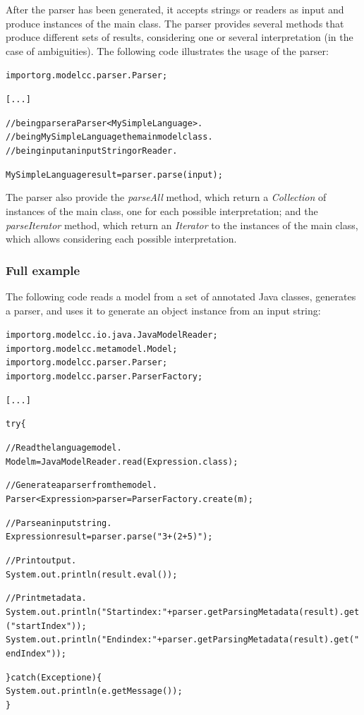 \documentclass[a4paper,twoside,onecolumn]{article}
\newenvironment{colframe}{%
  \begin{Sbox} 
    \begin{minipage}{.8\columnwidth} 
}{%

  \end{minipage} 
  \end{Sbox} 
  \begin{center} 
    \fcolorbox{black}{MyGray}{\TheSbox} 
  \end{center} 
}
\begin{document}
After the parser has been generated, it accepts strings or readers as input and produce instances of the main class. The parser provides several methods that produce different sets of results, considering one or several interpretation (in the case of ambiguities). The following code illustrates the usage of the parser:

\begin{colframe}
\begin{alltt}
import org.modelcc.parser.Parser;

[...]

//being parser a Parser<MySimpleLanguage>.
//being MySimpleLanguage the main model class.
//being input an input String or Reader.

MySimpleLanguage result = parser.parse(input);
\end{alltt}
\end{colframe}

The parser also provide the \emph{parseAll} method, which return a \emph{Collection} of instances of the main class, one for each possible interpretation; and the \emph{parseIterator} method, which return an \emph{Iterator} to the instances of the main class, which allows considering each possible interpretation.

\subsubsection{Full example} \label{sec:fullexample}

The following code reads a model from a set of annotated Java classes, generates a parser, and uses it to generate an object instance from an input string:

\begin{colframe}
\begin{alltt}
import org.modelcc.io.java.JavaModelReader;
import org.modelcc.metamodel.Model;
import org.modelcc.parser.Parser;
import org.modelcc.parser.ParserFactory;

[...]

try \{

  // Read the language model.
  Model m = JavaModelReader.read(Expression.class);

  // Generate a parser from the model.
  Parser<Expression> parser = ParserFactory.create(m);

  // Parse an input string.
  Expression result = parser.parse("3+(2+5)");

  // Print output.
  System.out.println(result.eval());

  // Print metadata.
  System.out.println("Start index: "+parser.getParsingMetadata(result).get("startIndex"));
  System.out.println("End index: "+parser.getParsingMetadata(result).get("endIndex"));

\} catch (Exception e) \{
  System.out.println(e.getMessage());
\}
\end{alltt}
\end{colframe}
\end{document}
